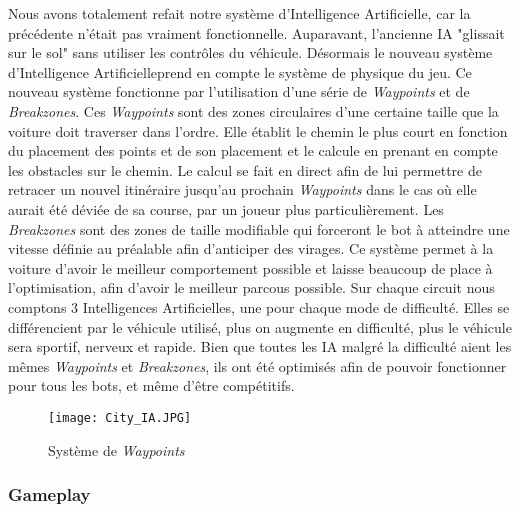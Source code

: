 \documentclass[a4paper,12pt]{article}
\newcommand{\AI}{Intelligence Artificielle}
\begin{document}
            Nous avons totalement refait notre système d'\AI, car la précédente n'était pas vraiment fonctionnelle. Auparavant, l'ancienne IA "glissait sur le sol" sans utiliser les contrôles du véhicule. Désormais le nouveau système d'\AI\;prend en compte le système de physique du jeu. Ce nouveau système fonctionne par l'utilisation d'une série de \textsl{Waypoints} et de \textsl{Breakzones}. Ces \textsl{Waypoints} sont des zones circulaires d'une certaine taille que la voiture doit traverser dans l'ordre. Elle établit le chemin le plus court en fonction du placement des points et de son placement et le calcule en prenant en compte les obstacles sur le chemin. Le calcul se fait en direct afin de lui permettre de retracer un nouvel itinéraire jusqu'au prochain \textsl{Waypoints} dans le cas où elle aurait été déviée de sa course, par un joueur plus particulièrement. Les \textsl{Breakzones} sont des zones de taille modifiable qui forceront le bot à atteindre une vitesse définie au préalable afin d'anticiper des virages. Ce système permet à la voiture d'avoir le meilleur comportement possible et laisse beaucoup de place à l'optimisation, afin d'avoir le meilleur parcous possible. Sur chaque circuit nous comptons 3 Intelligences Artificielles, une pour chaque mode de difficulté. Elles se différencient par le véhicule utilisé, plus on augmente en difficulté, plus le véhicule sera sportif, nerveux et rapide. Bien que toutes les IA malgré la difficulté aient les mêmes \textsl{Waypoints} et \textsl{Breakzones}, ils ont été optimisés afin de pouvoir fonctionner pour tous les bots, et même d'être compétitifs.
            \begin{figure}[h]
                \centering
                \texttt{[image: City\_IA.JPG]}
                \caption{Système de \textit{Waypoints}}
            \end{figure}
            
            \clearpage
            \subsubsection{Gameplay}
            
\end{document}
